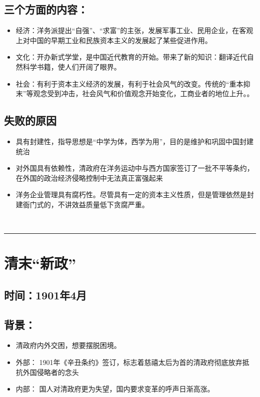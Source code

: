 \documentclass{article}
\begin{document}
\subsection*{三个方面的内容：}
\begin{itemize}
    \item 经济：洋务派提出``自强''、``求富''的主张，发展军事工业、民用企业，在客观上对中国的早期工业和民族资本主义的发展起了某些促进作用。
    \item 文化：开办新式学堂，是中国近代教育的开始。带来了新的知识：翻译近代自然科学书籍，使人们开阔了眼界。
    \item 社会：有利于资本主义经济的发展，有利于社会风气的改变。传统的``重本抑末''等观念受到冲击，社会风气和价值观念开始变化，工商业者的地位上升。。
\end{itemize}
\subsection*{失败的原因}
\begin{itemize}
	\item 具有封建性，指导思想是“中学为体，西学为用”，目的是维护和巩固中国封建统治
	\item 对外国具有依赖性，清政府在洋务运动中与西方国家签订了一批不平等条约，在外国的政治经济侵略控制中无法真正富强起来
	\item 洋务企业管理具有腐朽性。尽管具有一定的资本主义性质，但是管理依然是封建衙门式的，不讲效益质量低下贪腐严重。
\end{itemize}
\ \hrule

\section*{清末``新政''}
\subsection*{时间：1901年4月}
\subsection*{背景：}
\begin{itemize}
	\item 清政府内外交困，想要摆脱困境。
	\item 外部： 1901年《辛丑条约》签订，标志着慈禧太后为首的清政府彻底放弃抵抗外国侵略者的念头
	\item 内部： 国人对清政府更为失望，国内要求变革的呼声日渐高涨。
\end{itemize}
\end{document}
